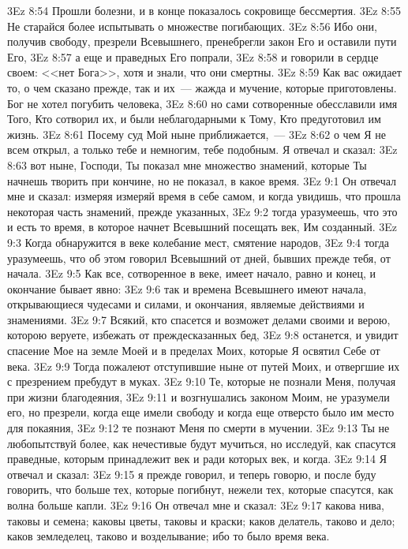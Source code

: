 \vs 3Ez 8:54 Прошли болезни, и в конце показалось сокровище бессмертия.
\vs 3Ez 8:55 Не старайся более испытывать о множестве погибающих.
\vs 3Ez 8:56 Ибо они, получив свободу, презрели Всевышнего, пренебрегли закон Его и оставили пути Его,
\vs 3Ez 8:57 а еще и праведных Его попрали,
\vs 3Ez 8:58 и говорили в сердце своем: <<нет Бога>>, хотя и знали, что они смертны.
\vs 3Ez 8:59 Как вас ожидает то, о чем сказано прежде, так и их~--- жажда и мучение, которые приготовлены. Бог не хотел погубить человека,
\vs 3Ez 8:60 но сами сотворенные обесславили имя Того, Кто сотворил их, и были неблагодарными к Тому, Кто предуготовил им жизнь.
\vs 3Ez 8:61 Посему суд Мой ныне приближается,~---
\vs 3Ez 8:62 о чем Я не всем открыл, а только тебе и немногим, тебе подобным. Я отвечал и сказал:
\vs 3Ez 8:63 вот ныне, Господи, Ты показал мне множество знамений, которые Ты начнешь творить при кончине, но не показал, в какое время.
\vs 3Ez 9:1 Он отвечал мне и сказал: измеряя измеряй время в себе самом, и когда увидишь, что прошла некоторая часть знамений, прежде указанных,
\vs 3Ez 9:2 тогда уразумеешь, что это и есть то время, в которое начнет Всевышний посещать век, Им созданный.
\vs 3Ez 9:3 Когда обнаружится в веке колебание мест, смятение народов,
\vs 3Ez 9:4 тогда уразумеешь, что об этом говорил Всевышний от дней, бывших прежде тебя, от начала.
\vs 3Ez 9:5 Как все, сотворенное в веке, имеет начало, равно и конец, и окончание бывает явно:
\vs 3Ez 9:6 так и времена Всевышнего имеют начала, открывающиеся чудесами и силами, и окончания, являемые действиями и знамениями.
\vs 3Ez 9:7 Всякий, кто спасется и возможет делами своими и верою, которою веруете, избежать от преждесказанных бед,
\vs 3Ez 9:8 останется, и увидит спасение Мое на земле Моей и в пределах Моих, которые Я освятил Себе от века.
\vs 3Ez 9:9 Тогда пожалеют отступившие ныне от путей Моих, и отвергшие их с презрением пребудут в муках.
\vs 3Ez 9:10 Те, которые не познали Меня, получая при жизни благодеяния,
\vs 3Ez 9:11 и возгнушались законом Моим, не уразумели его, но презрели, когда еще имели свободу и когда еще отверсто было им место для покаяния,
\vs 3Ez 9:12 те познают Меня по смерти в мучении.
\vs 3Ez 9:13 Ты не любопытствуй более, как нечестивые будут мучиться, но исследуй, как спасутся праведные, которым принадлежит век и ради которых век, и когда.
\vs 3Ez 9:14 Я отвечал и сказал:
\vs 3Ez 9:15 я прежде говорил, и теперь говорю, и после буду говорить, что больше тех, которые погибнут, нежели тех, которые спасутся, как волна больше капли.
\vs 3Ez 9:16 Он отвечал мне и сказал:
\vs 3Ez 9:17 какова нива, таковы и семена; каковы цветы, таковы и краски; каков делатель, таково и дело; каков земледелец, таково и возделывание; ибо то было время века.

